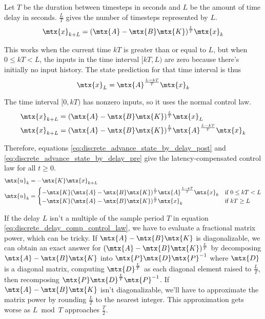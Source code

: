 Let $T$ be the duration between timesteps in seconds and $L$ be the amount of
time delay in seconds. $\frac{L}{T}$ gives the number of timesteps represented
by $L$.
\begin{equation}
  \mtx{x}_{k+L} = (\mtx{A} - \mtx{B}\mtx{K})^\frac{L}{T} \mtx{x}_k
    \label{eq:discrete_advance_state_by_delay_post}
\end{equation}

This works when the current time $kT$ is greater than or equal to $L$, but when
$0 \leq kT < L$, the inputs in the time interval $[kT, L)$ are zero because
there's initially no input history. The state prediction for that time interval
is thus
\begin{equation*}
  \mtx{x}_L = \mtx{A}^\frac{L - kT}{T} \mtx{x}_k
\end{equation*}

The time interval $[0, kT)$ has nonzero inputs, so it uses the normal control
law.
\begin{align}
  \mtx{x}_{k + L} &= (\mtx{A} - \mtx{B}\mtx{K})^\frac{L}{T} \mtx{x}_L
    \nonumber \\
  \mtx{x}_{k + L} &= (\mtx{A} - \mtx{B}\mtx{K})^\frac{L}{T}
    \mtx{A}^\frac{L - kT}{T} \mtx{x}_k
    \label{eq:discrete_advance_state_by_delay_pre}
\end{align}

Therefore, equations \eqref{eq:discrete_advance_state_by_delay_post} and
\eqref{eq:discrete_advance_state_by_delay_pre} give the latency-compensated
control law for all $t \geq 0$.
\begin{align}
  \mtx{u}_k &= -\mtx{K} \mtx{x}_{k + L} \nonumber \\
  \mtx{u}_k &=
  \begin{cases}
    -\mtx{K} (\mtx{A} - \mtx{B}\mtx{K})^\frac{L}{T} \mtx{A}^\frac{L - kT}{T}
      \mtx{x}_k & \text{if } 0 \leq kT < L \\
    -\mtx{K} (\mtx{A} - \mtx{B}\mtx{K})^\frac{L}{T} \mtx{x}_k &
      \text{if } kT \geq L
  \end{cases}
  \label{eq:discrete_delay_comp_control_law}
\end{align}

If the delay $L$ isn't a multiple of the sample period $T$ in equation
\eqref{eq:discrete_delay_comp_control_law}, we have to evaluate a fractional
matrix power, which can be tricky. If $\mtx{A} - \mtx{B}\mtx{K}$ is
diagonalizable, we can obtain an exact answer for
$(\mtx{A} - \mtx{B}\mtx{K})^\frac{L}{T}$ by decomposing
$\mtx{A} - \mtx{B}\mtx{K}$ into $\mtx{P}\mtx{D}\mtx{P}^{-1}$ where $\mtx{D}$ is
a diagonal matrix, computing $\mtx{D}^\frac{L}{T}$ as each diagonal element
raised to $\frac{L}{T}$, then recomposing
$\mtx{P}\mtx{D}^\frac{L}{T}\mtx{P}^{-1}$. If $\mtx{A} - \mtx{B}\mtx{K}$ isn't
diagonalizable, we'll have to approximate the matrix power by rounding
$\frac{L}{T}$ to the nearest integer. This approximation gets worse as
$L \bmod T$ approaches $\frac{T}{2}$.
